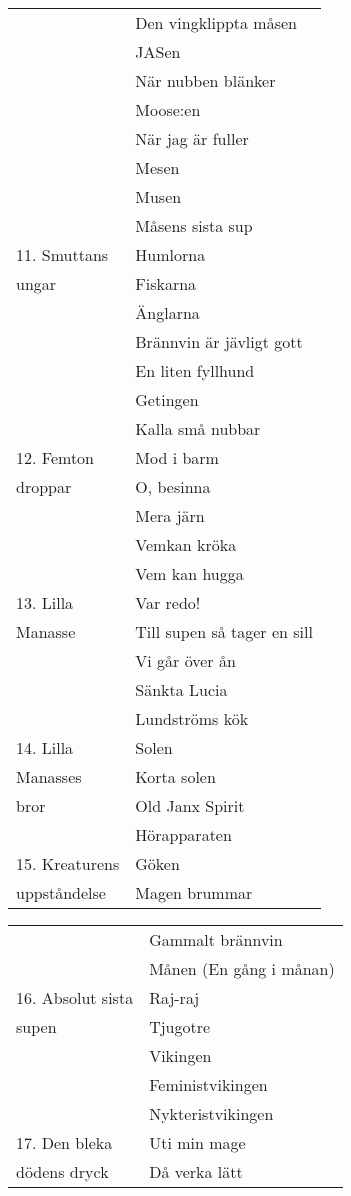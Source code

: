 \documentclass[a6paper,10pt]{article}
\begin{document}
\noindent
\begin{tabularx}{1\textwidth}{l X}
&Den vingklippta måsen\\
&JASen\\
&När nubben blänker\\
&Moose:en\\
&När jag är fuller\\
&Mesen\\
&Musen\\
&Måsens sista sup\\
11. Smuttans&Humlorna\\
\hspace{17pt}ungar&Fiskarna\\
&Änglarna\\
&Brännvin är jävligt gott\\
&En liten fyllhund\\
&Getingen\\
&Kalla små nubbar\\
12. Femton&Mod i barm\\
\hspace{17pt}droppar&O, besinna\\
&Mera järn\\
&Vemkan kröka\\
&Vem kan hugga\\
13. Lilla&Var redo!\\
\hspace{17pt}Manasse&Till supen så tager en sill\\
&Vi går över ån\\
&Sänkta Lucia\\
&Lundströms kök\\
14. Lilla&Solen\\
\hspace{17pt}Manasses&Korta solen\\
\hspace{17pt}bror&Old Janx Spirit\\
&Hörapparaten\\
15. Kreaturens&Göken\\
\hspace{17pt}uppståndelse&Magen brummar
\end{tabularx}
\begin{tabularx}{1\textwidth}{l X}
&Gammalt brännvin\\
&Månen (En gång i månan)\\
16. Absolut sista&Raj-raj\\
\hspace{17pt}supen&Tjugotre\\
&Vikingen\\
&Feministvikingen\\
&Nykteristvikingen\\
17. Den bleka&Uti min mage\\
\hspace{17pt}dödens dryck&Då verka lätt
\end{tabularx}
\end{document}
